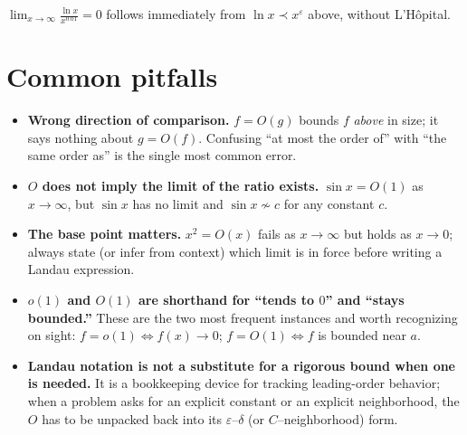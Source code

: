 \documentclass{essay}
\begin{document}
\begin{example}
$\displaystyle\lim_{x\to\infty}\frac{\ln x}{x^{0.01}} = 0$ follows immediately from $\ln x \prec x^{\varepsilon}$ above, without L'Hôpital.
\end{example}

\section{Common pitfalls}

\begin{itemize}
  \item \textbf{Wrong direction of comparison.} $f=O(g)$ bounds $f$ \emph{above} in size; it says nothing about $g=O(f)$. Confusing ``at most the order of'' with ``the same order as'' is the single most common error.
  \item \textbf{$O$ does not imply the limit of the ratio exists.} $\sin x = O(1)$ as $x\to\infty$, but $\sin x$ has no limit and $\sin x \not\sim c$ for any constant $c$.
  \item \textbf{The base point matters.} $x^2 = O(x)$ fails as $x\to\infty$ but holds as $x\to 0$; always state (or infer from context) which limit is in force before writing a Landau expression.
  \item \textbf{$o(1)$ and $O(1)$ are shorthand for ``tends to $0$'' and ``stays bounded.''} These are the two most frequent instances and worth recognizing on sight: $f=o(1) \iff f(x)\to 0$; $f=O(1) \iff f$ is bounded near $a$.
  \item \textbf{Landau notation is not a substitute for a rigorous bound when one is needed.} It is a bookkeeping device for tracking leading-order behavior; when a problem asks for an explicit constant or an explicit neighborhood, the $O$ has to be unpacked back into its $\varepsilon$--$\delta$ (or $C$--neighborhood) form.
\end{itemize}
\end{document}
